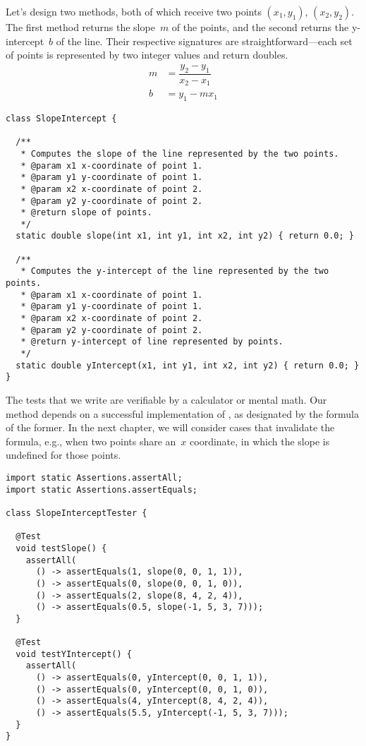 Let's design two methods, both of which receive two points $(x_1, y_1)$, $(x_2, y_2)$. 
The first method returns the slope~$m$ of the points, and the second returns the y-intercept~$b$ of the line. 
Their respective signatures are straightforward---each set of points is represented by two integer values and return doubles.
\begin{align*}
m &= \dfrac{y_2-y_1}{x_2-x_1}\\
b &= y_1 - mx_1
\end{align*}
\enlargethispage{3\baselineskip}
\begin{lstlisting}[language=MyJava]
class SlopeIntercept {

  /**
   * Computes the slope of the line represented by the two points.
   * @param x1 x-coordinate of point 1.
   * @param y1 y-coordinate of point 1.
   * @param x2 x-coordinate of point 2.
   * @param y2 y-coordinate of point 2.
   * @return slope of points.
   */
  static double slope(int x1, int y1, int x2, int y2) { return 0.0; }

  /**
   * Computes the y-intercept of the line represented by the two points.
   * @param x1 x-coordinate of point 1.
   * @param y1 y-coordinate of point 1.
   * @param x2 x-coordinate of point 2.
   * @param y2 y-coordinate of point 2.
   * @return y-intercept of line represented by points.
   */
  static double yIntercept(x1, int y1, int x2, int y2) { return 0.0; }
}
\end{lstlisting}

The tests that we write are verifiable by a calculator or mental math. 
Our  method depends on a successful implementation of , as designated by the formula of the former. 
In the next chapter, we will consider cases that invalidate the formula, e.g., when two points share an~$x$ coordinate, in which the slope is undefined for those points.

\begin{lstlisting}[language=MyJava]
import static Assertions.assertAll;
import static Assertions.assertEquals;

class SlopeInterceptTester {
  
  @Test
  void testSlope() {
    assertAll(
      () -> assertEquals(1, slope(0, 0, 1, 1)),
      () -> assertEquals(0, slope(0, 0, 1, 0)),
      () -> assertEquals(2, slope(8, 4, 2, 4)),
      () -> assertEquals(0.5, slope(-1, 5, 3, 7)));
  }

  @Test
  void testYIntercept() {
    assertAll(
      () -> assertEquals(0, yIntercept(0, 0, 1, 1)),
      () -> assertEquals(0, yIntercept(0, 0, 1, 0)),
      () -> assertEquals(4, yIntercept(8, 4, 2, 4)),
      () -> assertEquals(5.5, yIntercept(-1, 5, 3, 7)));
  }
}
\end{lstlisting}

